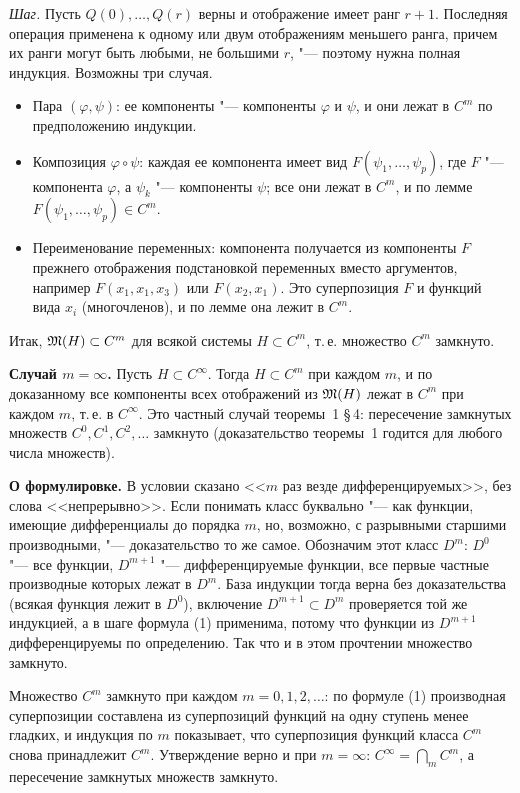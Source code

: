 \begin{solution}[1 (\S\,5)]
\emph{Шаг.} Пусть $Q(0),\dots,Q(r)$ верны и отображение имеет ранг $r+1$.
Последняя операция применена к одному или двум отображениям меньшего ранга,
причем их ранги могут быть любыми, не большими $r$, "--- поэтому нужна
полная индукция. Возможны три случая.
\begin{itemize}[leftmargin=1.2em,itemsep=2pt]
\item Пара $(\varphi,\psi)$: ее компоненты "--- компоненты $\varphi$ и $\psi$,
  и они лежат в $C^m$ по предположению индукции.
\item Композиция $\varphi\circ\psi$: каждая ее компонента имеет вид
  $F(\psi_1,\dots,\psi_p)$, где $F$ "--- компонента $\varphi$, а $\psi_k$ "---
  компоненты $\psi$; все они лежат в $C^m$, и по лемме
  $F(\psi_1,\dots,\psi_p)\in C^m$.
\item Переименование переменных: компонента получается из компоненты $F$
  прежнего отображения подстановкой переменных вместо аргументов, например
  $F(x_1,x_1,x_3)$ или $F(x_2,x_1)$. Это суперпозиция $F$ и функций вида
  $x_i$ (многочленов), и по лемме она лежит в $C^m$.
\end{itemize}
Итак, $\mathfrak M(H)\subset C^m$ для всякой системы $H\subset C^m$, т.\,е. множество
$C^m$ замкнуто.

\textbf{Случай $m=\infty$.} Пусть $H\subset C^\infty$. Тогда $H\subset C^m$
при каждом $m$, и по доказанному все компоненты всех отображений из $\mathfrak M(H)$
лежат в $C^m$ при каждом $m$, т.\,е. в $C^\infty$. Это частный случай
теоремы~1 \S\,4: пересечение замкнутых множеств $C^0,C^1,C^2,\dots$ замкнуто
(доказательство теоремы~1 годится для любого числа множеств).

\textbf{О формулировке.} В условии сказано <<$m$ раз везде
дифференцируемых>>, без слова <<непрерывно>>. Если понимать класс
буквально "--- как функции, имеющие дифференциалы до порядка $m$, но,
возможно, с разрывными старшими производными, "--- доказательство то же
самое. Обозначим этот класс $D^m$: $D^0$ "--- все функции, $D^{m+1}$ "---
дифференцируемые функции, все первые частные производные которых лежат
в $D^m$. База индукции тогда верна без доказательства (всякая функция лежит
в $D^0$), включение $D^{m+1}\subset D^m$ проверяется той же индукцией, а
в шаге формула (1) применима, потому что функции из $D^{m+1}$
дифференцируемы по определению. Так что и в этом прочтении множество
замкнуто.

\answer Множество $C^m$ замкнуто при каждом $m=0,1,2,\dots$: по формуле
(1) производная суперпозиции составлена из суперпозиций функций на одну
ступень менее гладких, и индукция по $m$ показывает, что суперпозиция
функций класса $C^m$ снова принадлежит $C^m$. Утверждение верно и при
$m=\infty$: $C^\infty=\bigcap_mC^m$, а пересечение замкнутых множеств
замкнуто.
\end{solution}

